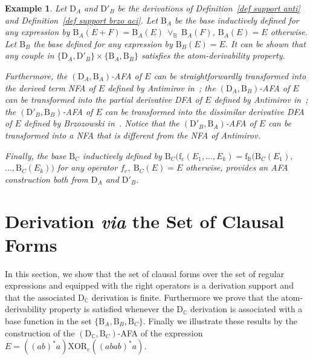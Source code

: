 \documentclass{article}
\newtheorem{example}{Example}
\begin{document}
   \begin{example}
    Let $\mathrm{D}_A$ and $\mathrm{D}'_B$ be the derivations of Definition~\ref{def support anti} and Definition~\ref{def support brzo aci}.
    Let $\mathrm{B}_{A}$ be the base inductively defined for any expression by  $\mathrm{B}_{A}(E+F)=\mathrm{B}_{A}(E)\ \vee_{\mathbb{B}}\ \mathrm{B}_{A}(F)$, $\mathrm{B}_{A}(E)=E$ otherwise.
    Let $\mathrm{B}_{B}$ the base defined for any expression by $\mathrm{B}_{B}(E)=E$.
    It can be shown that any couple in $\{\mathrm{D}_A,\mathrm{D}'_B\}\times\{\mathrm{B}_{A},\mathrm{B}_{B}\}$ satisfies the atom-derivability property.
    
    Furthermore, the $(\mathrm{D}_A,\mathrm{B}_A)$-AFA of $E$ can be straightforwardly transformed into the 
derived
    term NFA of $E$ defined by Antimirov in~\cite{Ant96}; the $(\mathrm{D}_A,\mathrm{B}_B)$-AFA of $E$ can be transformed into the partial derivative DFA of $E$ defined by Antimirov in~\cite{Ant96};  the $(\mathrm{D}'_B,\mathrm{B}_B)$-AFA of $E$ can be transformed into the dissimilar derivative DFA of $E$ defined by Brzozowski in~\cite{Brz64}. Notice that the $(\mathrm{D}'_B,\mathrm{B}_A)$-AFA of $E$ can be transformed into a NFA that is different from the NFA of Antimirov.
    
    Finally, the base $\mathrm{B}_C$ inductively defined by $\mathrm{B}_C(\mathrm{f}_e(E_1,\ldots,E_k)=\mathrm{f}_{\mathbb{B}}(\mathrm{B}_C(E_1),$ $\ldots,\mathrm{B}_C(E_k))$ for any operator $f_e$, $\mathrm{B}_C(E)=E$ otherwise, provides an AFA construction both from $\mathrm{D}_A$ and $\mathrm{D}'_B$.
  \end{example}

  \section{Derivation \emph{via} the Set of Clausal Forms}\label{sec deriv via set clausal form}
    
    In this section, we show that the set of clausal forms over the set of regular expressions and equipped with the right operators is a derivation support and that the associated $\mathrm{D}_{\mathbb{C}}$ derivation is finite. Furthermore we prove that the atom-derivability property is satisfied whenever the $\mathrm{D}_{\mathbb{C}}$ derivation is associated with a base function in the set $\{\mathrm{B}_A, \mathrm{B}_B, \mathrm{B}_C\}$. Finally we illustrate these results by the construction of the $(\mathrm{D}_{\mathbb{C}},\mathrm{B}_C)$-AFA of the expression $E=((ab)^*a)\mathrm{XOR}_e ((abab)^*a)$.
    
\end{document}
